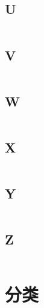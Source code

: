 \documentclass[UTF8]{../RepresentationUniverse}
\begin{document}
\section{U}
\begin{lstlisting}

\end{lstlisting}


\section{V}
\begin{lstlisting}

\end{lstlisting}


\section{W}
\begin{lstlisting}

\end{lstlisting}


\section{X}
\begin{lstlisting}

\end{lstlisting}


\section{Y}
\begin{lstlisting}

\end{lstlisting}


\section{Z}
\begin{lstlisting}

\end{lstlisting}






\chapter{分类}
\end{document}
